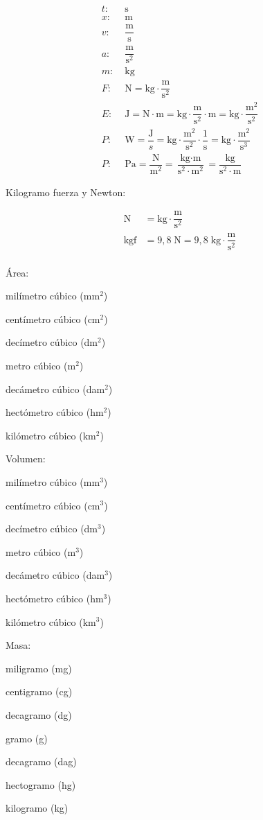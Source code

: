 \vspace{-3em}
\begin{align*}
t:\;& \text{s}\\
x:\;& \text{m}\\
v:\;& \dfrac{\text{m}}{\text{s}}\\
a:\;& \dfrac{\text{m}}{\text{s}^2}\\
m:\;& \text{kg}\\
F:\;&  \text{N} = \text{kg}\cdot \dfrac{\text{m}}{\text{s}^2}\\
E:\;&  \text{J} = \text{N}\cdot\text{m} = \text{kg}\cdot \dfrac{\text{m}}{\text{s}^2} \cdot \text{m} = \text{kg}\cdot \dfrac{\text{m}^2}{\text{s}^2}\\
P:\;& \text{W} = \dfrac{\text{J}}{s} = \text{kg}\cdot \dfrac{\text{m}^2}{\text{s}^2} \cdot \dfrac{1}{\text{s}} = \text{kg}\cdot \dfrac{\text{m}^2}{\text{s}^3}\\
P:\;&\text{Pa} = \dfrac{\text{N}}{\text{m}^2} = \dfrac{\text{kg}\cdot \text{m}}{\text{s}^2 \cdot \text{m}^2} = \dfrac{\text{kg}}{\text{s}^2 \cdot \text{m}}
\end{align*}

Kilogramo fuerza y Newton:

\begin{align*}
    \text{N} &= \text{kg} \cdot \dfrac{\text{m}}{\text{s}^2}\\
    \text{kgf} &= 9,8 \;\text{N} = 9,8\;\text{kg} \cdot \dfrac{\text{m}}{\text{s}^2} \\
\end{align*}

\begin{multicols}{3}
\noindent
Área:

milímetro cúbico (mm$^2$)

centímetro cúbico (cm$^2$)

decímetro cúbico (dm$^2$)

metro cúbico (m$^2$)

decámetro cúbico (dam$^2$)

hectómetro cúbico (hm$^2$)

kilómetro cúbico (km$^2$)

\vspace{1cm}
\noindent
Volumen:

milímetro cúbico (mm$^3$)

centímetro cúbico (cm$^3$)

decímetro cúbico (dm$^3$)

metro cúbico (m$^3$)

decámetro cúbico (dam$^3$)

hectómetro cúbico (hm$^3$)

kilómetro cúbico (km$^3$)

\vspace{1cm}
\noindent
Masa:

miligramo (mg)

centigramo (cg)

decagramo (dg)

gramo (g)

decagramo (dag)

hectogramo (hg)

kilogramo (kg)
\end{multicols}


